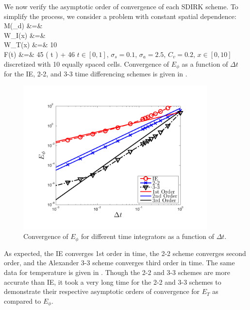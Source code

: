 We now verify the asymptotic order of convergence of each SDIRK scheme.
To simplify the process, we consider a problem with constant spatial dependence:
\beanum
M(\mu_d) &=&  \\
W_I(x) &=&  \\
W_T(x) &=&  10 \\
F(t) &=& 45 \cos\left( \pi t \right) + 46 \pec
\eeanum
$t \in[0,1]$, $\sigma_s = 0.1$, $\sigma_a = 2.5$, $C_v = 0.2$, $x\in[0,10]$ discretized with 10 equally spaced cells.  Convergence of $E_{\phi}$ as a function of $\Delta t$ for the IE, 2-2, and 3-3 time differencing schemes is given in .
\begin{figure}[!htp]
\centering
\includegraphics[width=10cm,trim=0.25in  0.2in 0.75in 0.5in,clip=true]{chapter6_grey_radtran/Dissertation_Data/Time_Integrators_Convergence_Phi.pdf}
\caption{Convergence of $E_{\phi}$ for different time integrators as a function of $\Delta t$.}
\label{fig:e_phi_time}
\end{figure}
As expected, the IE converges 1st order in time, the 2-2 scheme converges second order, and the Alexander 3-3 scheme converges third order in time.
The same data for temperature is given in .  
Though the 2-2 and 3-3 schemes are more accurate than IE, it took a very long time for the 2-2 and 3-3 schemes to demonstrate their respective asymptotic orders of convergence for $E_T$ as compared to $E_{\phi}$.
